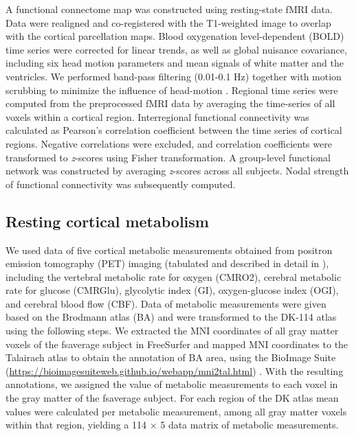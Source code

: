 \begin{refsection}
A functional connectome map was constructed using resting-state fMRI data. Data were realigned and co-registered with the T1-weighted image to overlap with the cortical parcellation maps. Blood oxygenation level-dependent (BOLD) time series were corrected for linear trends, as well as global nuisance covariance, including six head motion parameters and mean signals of white matter and the ventricles. We performed band-pass filtering (0.01-0.1 Hz) together with motion scrubbing to minimize the influence of head-motion \citep{Power2012SpuriousBS}. Regional time series were computed from the preprocessed fMRI data by averaging the time-series of all voxels within a cortical region. Interregional functional connectivity was calculated as Pearson's correlation coefficient between the time series of cortical regions. Negative correlations were excluded, and correlation coefficients were transformed to \textit{z}-scores using Fisher transformation. A group-level functional network was constructed by averaging \textit{z}-scores across all subjects. Nodal strength of functional connectivity was subsequently computed.



\subsection*{Resting cortical metabolism}

We used data of five cortical metabolic measurements obtained from positron emission tomography (PET) imaging (tabulated and described in detail in \citep{Vaishnavi2010RegionalAG}), including the vertebral metabolic rate for oxygen (CMRO2), cerebral metabolic rate for glucose (CMRGlu), glycolytic index (GI), oxygen-glucose index (OGI), and cerebral blood flow (CBF). Data of metabolic measurements were given based on the Brodmann atlas (BA) and were transformed to the DK-114 atlas using the following steps. We extracted the MNI coordinates of all gray matter voxels of the fsaverage subject in FreeSurfer and mapped MNI coordinates to the Talairach atlas to obtain the annotation of BA area, using the BioImage Suite (\url{https://bioimagesuiteweb.github.io/webapp/mni2tal.html}) \citep{Lacadie2008MoreAT}. With the resulting annotations, we assigned the value of metabolic measurements to each voxel in the gray matter of the fsaverage subject. For each region of the DK atlas mean values were calculated per metabolic measurement, among all gray matter voxels within that region, yielding a 114 × 5 data matrix of metabolic measurements.


\end{refsection}
